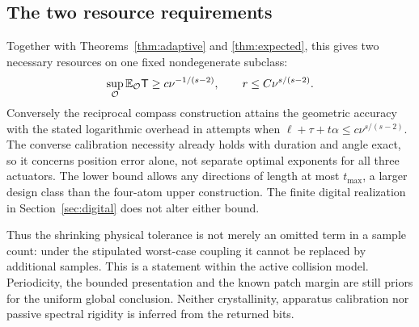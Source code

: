 \subsection{The two resource requirements}
Together with Theorems~\ref{thm:adaptive} and \ref{thm:expected}, this
gives two necessary resources on one fixed nondegenerate subclass:
\[
 \sup_{\mathcal O}\mathbb E_{\mathcal O}\mathsf T
       \ge c\nu^{-1/(s-2)},\qquad
 r\le C\nu^{s/(s-2)}.
\]
Conversely the reciprocal compass construction attains the geometric
accuracy with the stated logarithmic overhead in attempts when
$\ell+\tau+t\alpha\le c\nu^{s/(s-2)}$. The converse calibration
necessity already holds with duration and angle exact, so it concerns
position error alone, not separate optimal exponents for all three
actuators. The lower bound allows any directions of length at most
$t_{\max}$, a larger design class than the four-atom upper construction.
The finite digital realization in Section~\ref{sec:digital} does not
alter either bound.

Thus the shrinking physical tolerance is not merely an omitted term in
a sample count: under the stipulated worst-case coupling it cannot be
replaced by additional samples. This is a statement within the active
collision model. Periodicity, the bounded presentation and the known
patch margin are still priors for the uniform global conclusion.
Neither crystallinity, apparatus calibration nor passive spectral
rigidity is inferred from the returned bits.
